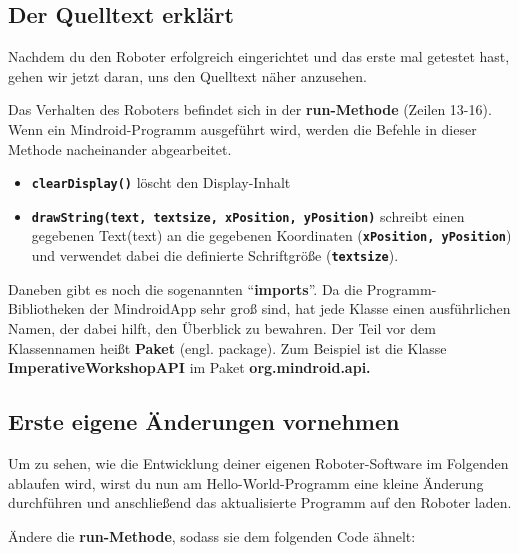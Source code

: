 \documentclass[
	12pt,
	article,
	type=bsc, %
	colorbacktitle,
	instlogo,
	accentcolor=tud1c,
	german,
	twoside
]{tudexercise}
\newcommand{\solpath}[0]{../../impl/androidApp/app/src/main/java/org/mindroid/android/app/workshopSolutions}
\newcommand{\bfcode}[1]{\texttt{\textbf{#1}}}
\begin{document}
\subsection{Der Quelltext erklärt}
Nachdem du den Roboter erfolgreich eingerichtet und das erste mal getestet hast, gehen wir jetzt daran, uns den Quelltext näher anzusehen.

Das Verhalten des Roboters befindet sich in der \textbf{run-Methode }(Zeilen 13-16). Wenn ein Mindroid-Programm ausgeführt wird, werden die Befehle in dieser Methode nacheinander abgearbeitet.
	\begin{itemize}
	\item{\bfcode{clearDisplay()}} löscht den Display-Inhalt
	\item{\bfcode{drawString(text, textsize, xPosition, yPosition)}} schreibt einen gegebenen Text(text) an die gegebenen Koordinaten (\bfcode{xPosition, yPosition}) und verwendet dabei die definierte Schriftgröße (\bfcode{textsize}).
	\end{itemize}
	Daneben gibt es noch die sogenannten “\textbf{imports}”. Da die Programm-Bibliotheken der MindroidApp sehr groß sind, hat jede Klasse einen ausführlichen Namen, der dabei hilft, den Überblick zu bewahren. Der Teil vor dem Klassennamen heißt \textbf{Paket} (engl. package). Zum Beispiel ist die Klasse \textbf{ImperativeWorkshopAPI} im Paket \textbf{org.mindroid.api.}
	
	\subsection{Erste eigene Änderungen vornehmen}
	Um zu sehen, wie die Entwicklung deiner eigenen Roboter-Software im Folgenden ablaufen wird, wirst du nun am Hello-World-Programm eine kleine Änderung durchführen und anschließend das aktualisierte Programm auf den Roboter laden.

	Ändere die \textbf{run-Methode}, sodass sie dem folgenden Code ähnelt:
	
\end{document}
